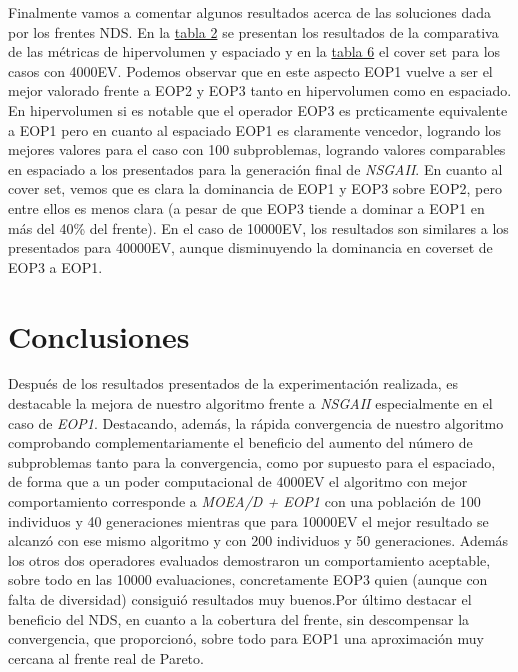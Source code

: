 Finalmente vamos a comentar algunos resultados acerca de las soluciones dada por los frentes NDS. En la \hyperref[table:2]{tabla 2} se presentan los resultados de la comparativa de las métricas de hipervolumen y espaciado y en la \hyperref[table:6]{tabla 6} el cover set para los casos con 4000EV. Podemos observar que en este aspecto EOP1 vuelve a ser el mejor valorado frente a EOP2 y EOP3 tanto en hipervolumen como en espaciado. En hipervolumen si es notable que el operador EOP3 es prcticamente equivalente a EOP1 pero en cuanto al espaciado EOP1 es claramente vencedor, logrando los mejores valores para el caso con 100 subproblemas, logrando valores comparables en espaciado a los presentados para la generación final de \textit{NSGAII}. En cuanto al cover set,  vemos que es clara la dominancia de EOP1 y EOP3 sobre EOP2, pero entre ellos es menos clara (a pesar de que EOP3 tiende a dominar a EOP1 en más del 40\% del frente). En el caso de 10000EV, los resultados son similares a los presentados para 40000EV, aunque disminuyendo la dominancia en coverset de EOP3 a EOP1.\\ 

\section{Conclusiones}

Después de los resultados presentados de la experimentación realizada, es destacable la mejora de nuestro algoritmo frente a \textit{NSGAII} especialmente en el caso de \textit{EOP1}. Destacando, además, la rápida convergencia de nuestro algoritmo comprobando complementariamente el beneficio del aumento del número de subproblemas tanto para la convergencia, como por supuesto para el espaciado, de forma que a un poder computacional de 4000EV el algoritmo con mejor comportamiento corresponde a \textit{MOEA/D + EOP1} con una población de 100 individuos y 40 generaciones mientras que para 10000EV el mejor resultado se alcanzó con ese mismo algoritmo y con 200 individuos y 50 generaciones. Además los otros dos operadores evaluados demostraron un comportamiento aceptable, sobre todo en las 10000 evaluaciones, concretamente EOP3 quien (aunque con falta de diversidad) consiguió resultados muy buenos.Por último destacar el beneficio del NDS, en cuanto a la cobertura del frente, sin descompensar la convergencia, que proporcionó, sobre todo para EOP1 una aproximación muy cercana al frente real de Pareto.\\


